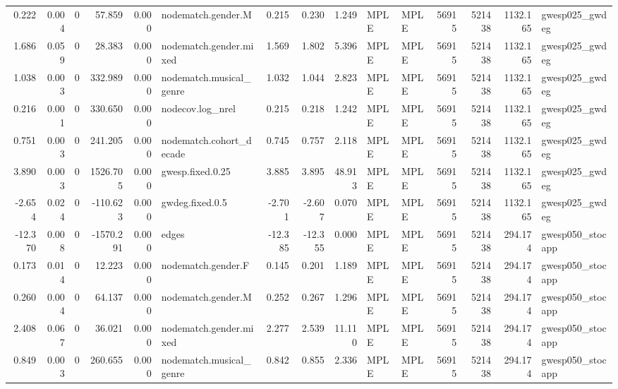 \begin{table}
\begin{tabular}{rrrrrlrrrllrrrl}
    0.222 & 0.004 &        0 &    57.859 &     0.000 &      nodematch.gender.M &   0.215 &   0.230 &   1.249 &         MPLE &   MPLE &   56915 &   521438 & 1132.165 &   gwesp025\_gwdeg \\
    1.686 & 0.059 &        0 &    28.383 &     0.000 &  nodematch.gender.mixed &   1.569 &   1.802 &   5.396 &         MPLE &   MPLE &   56915 &   521438 & 1132.165 &   gwesp025\_gwdeg \\
    1.038 & 0.003 &        0 &   332.989 &     0.000 & nodematch.musical\_genre &   1.032 &   1.044 &   2.823 &         MPLE &   MPLE &   56915 &   521438 & 1132.165 &   gwesp025\_gwdeg \\
    0.216 & 0.001 &        0 &   330.650 &     0.000 &        nodecov.log\_nrel &   0.215 &   0.218 &   1.242 &         MPLE &   MPLE &   56915 &   521438 & 1132.165 &   gwesp025\_gwdeg \\
    0.751 & 0.003 &        0 &   241.205 &     0.000 & nodematch.cohort\_decade &   0.745 &   0.757 &   2.118 &         MPLE &   MPLE &   56915 &   521438 & 1132.165 &   gwesp025\_gwdeg \\
    3.890 & 0.003 &        0 &  1526.705 &     0.000 &        gwesp.fixed.0.25 &   3.885 &   3.895 &  48.913 &         MPLE &   MPLE &   56915 &   521438 & 1132.165 &   gwesp025\_gwdeg \\
   -2.654 & 0.024 &        0 &  -110.623 &     0.000 &         gwdeg.fixed.0.5 &  -2.701 &  -2.607 &   0.070 &         MPLE &   MPLE &   56915 &   521438 & 1132.165 &   gwesp025\_gwdeg \\
  -12.370 & 0.008 &        0 & -1570.291 &     0.000 &                   edges & -12.385 & -12.355 &   0.000 &         MPLE &   MPLE &   56915 &   521438 &  294.174 & gwesp050\_stocapp \\
    0.173 & 0.014 &        0 &    12.223 &     0.000 &      nodematch.gender.F &   0.145 &   0.201 &   1.189 &         MPLE &   MPLE &   56915 &   521438 &  294.174 & gwesp050\_stocapp \\
    0.260 & 0.004 &        0 &    64.137 &     0.000 &      nodematch.gender.M &   0.252 &   0.267 &   1.296 &         MPLE &   MPLE &   56915 &   521438 &  294.174 & gwesp050\_stocapp \\
    2.408 & 0.067 &        0 &    36.021 &     0.000 &  nodematch.gender.mixed &   2.277 &   2.539 &  11.110 &         MPLE &   MPLE &   56915 &   521438 &  294.174 & gwesp050\_stocapp \\
    0.849 & 0.003 &        0 &   260.655 &     0.000 & nodematch.musical\_genre &   0.842 &   0.855 &   2.336 &         MPLE &   MPLE &   56915 &   521438 &  294.174 & gwesp050\_stocapp \\

\end{tabular}
\end{table}
